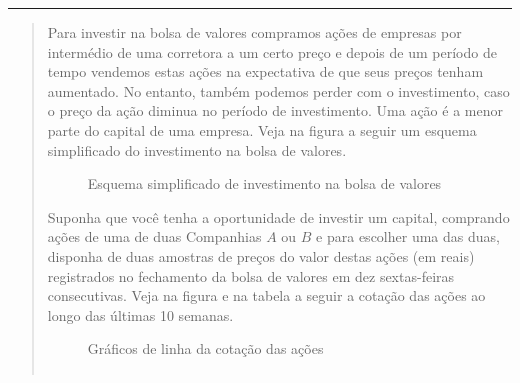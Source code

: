 \label{\detokenize{PE104-3:explorando-medidas-de-dispersao}}\label{\detokenize{PE104-3::doc}}\label{\detokenize{PE104-3:sec-explorando2}}\label{\detokenize{PE104-3:ativ-estrategia-de-investimento}}

\bigskip\hrule\bigskip

\begin{quote}

Para investir na bolsa de valores compramos ações de empresas por intermédio de uma corretora a um certo preço e depois de um período de tempo vendemos estas ações na expectativa de que seus preços tenham aumentado. No entanto, também podemos perder com o investimento, caso o preço da ação diminua no período de investimento. Uma ação é a menor parte do capital de uma empresa. Veja na figura a seguir um esquema simplificado do investimento na bolsa de valores.

\begin{figure}[H]
\centering
\capstart

\noindent{}
\caption{Esquema simplificado de investimento na bolsa de valores}\label{\detokenize{PE104-3:fig-ativ-bolsa-de-valores}}\label{\detokenize{PE104-3:id1}}\end{figure}

Suponha que você tenha a oportunidade de investir um capital, comprando ações de uma de duas  Companhias \(A\) ou \(B\) e para escolher uma das duas, disponha de duas amostras de preços do valor destas ações (em reais) registrados no fechamento da bolsa de valores em dez sextas-feiras consecutivas. Veja na figura e na tabela a seguir a cotação das ações ao longo das últimas 10 semanas.

\begin{figure}[H]
\centering
\capstart

\noindent{}
\caption{Gráficos de linha da cotação das ações}\label{\detokenize{PE104-3:fig-coloque-aqui-o-nome}}\label{\detokenize{PE104-3:id2}}\end{figure}


\begin{savenotes}\sphinxattablestart
\centering
\begin{tabulary}{\linewidth}[t]{|T|T|T|}
\hline


\end{tabulary}
\end{savenotes}
\end{quote}
